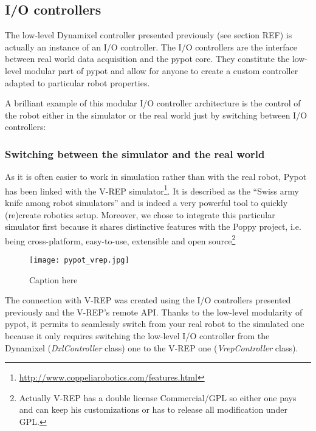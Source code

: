 \subsection{I/O controllers} %

The low-level Dynamixel controller presented previously (see section REF) is actually an instance of an I/O controller. The I/O controllers are the interface between real world data acquisition and the pypot core. They constitute the low-level modular part of pypot and allow for anyone to create a custom controller adapted to particular robot properties.

A brilliant example of this modular I/O controller architecture is the control of the robot either in the simulator or the real world just by switching between I/O controllers:

\subsubsection{Switching between the simulator and the real world} %

As it is often easier to work in simulation rather than with the real robot, Pypot has been linked with the V-REP simulator\footnote{\url{http://www.coppeliarobotics.com/features.html}}. It is described as the “Swiss army knife among robot simulators” and is indeed a very powerful tool to quickly (re)create robotics setup. Moreover, we chose to integrate this particular simulator first because it shares distinctive features with the Poppy project, i.e. being cross-platform, easy-to-use, extensible and open source\footnote{Actually V-REP has a double license Commercial/GPL so either one pays and can keep his customizations or has to release all modification under GPL.}

\begin{figure}[tb]
    \begin{center}
        \texttt{[image: pypot\_vrep.jpg]}
    \end{center}
    \caption{Caption here}
    \label{fig:pypot-vrep}
\end{figure}


The connection with V-REP was created using the I/O controllers presented previously and the V-REP’s remote API.
Thanks to the low-level modularity of pypot, it permits to seamlessly switch from your real robot to the simulated one because it only requires switching the low-level I/O controller from the Dynamixel (\emph{DxlController} class) one to the V-REP one (\emph{VrepController} class).


